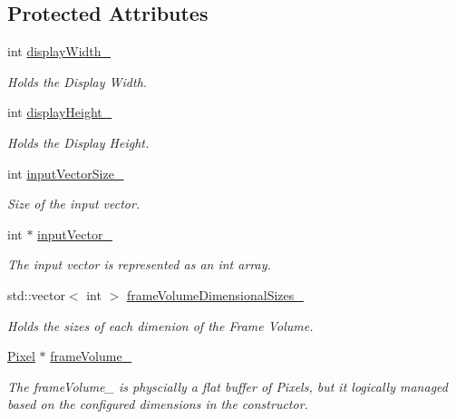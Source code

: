 \subsection*{Protected Attributes}
\begin{DoxyCompactItemize}
\item 
int \hyperlink{classnddi_1_1_base_nddi_display_ad9b1e0726fddd57b58f37624a72c7fe5}{displayWidth\_\-}
\begin{DoxyCompactList}\small\item\em Holds the Display Width. \item\end{DoxyCompactList}\item 
int \hyperlink{classnddi_1_1_base_nddi_display_a462ed74e3bd5ee923079badb352f7e97}{displayHeight\_\-}
\begin{DoxyCompactList}\small\item\em Holds the Display Height. \item\end{DoxyCompactList}\item 
int \hyperlink{classnddi_1_1_base_nddi_display_a8ea6b8a02ce1680040cb828facb98c5a}{inputVectorSize\_\-}
\begin{DoxyCompactList}\small\item\em Size of the input vector. \item\end{DoxyCompactList}\item 
int $\ast$ \hyperlink{classnddi_1_1_base_nddi_display_aca1b4dd9f1a11e85e96bb0eb1f143dc8}{inputVector\_\-}
\begin{DoxyCompactList}\small\item\em The input vector is represented as an int array. \item\end{DoxyCompactList}\item 
std::vector$<$ int $>$ \hyperlink{classnddi_1_1_base_nddi_display_a1a20c4ed32c3a9e218d8183204bc2afe}{frameVolumeDimensionalSizes\_\-}
\begin{DoxyCompactList}\small\item\em Holds the sizes of each dimenion of the Frame Volume. \item\end{DoxyCompactList}\item 
\hyperlink{unionnddi_1_1_pixel}{Pixel} $\ast$ \hyperlink{classnddi_1_1_base_nddi_display_aa5bb1202a2b39b4c7c0f6647e3a01a82}{frameVolume\_\-}
\begin{DoxyCompactList}\small\item\em The frameVolume\_\- is physcially a flat buffer of Pixels, but it logically managed based on the configured dimensions in the constructor. \item\end{DoxyCompactList}\item 

\end{DoxyCompactItemize}
